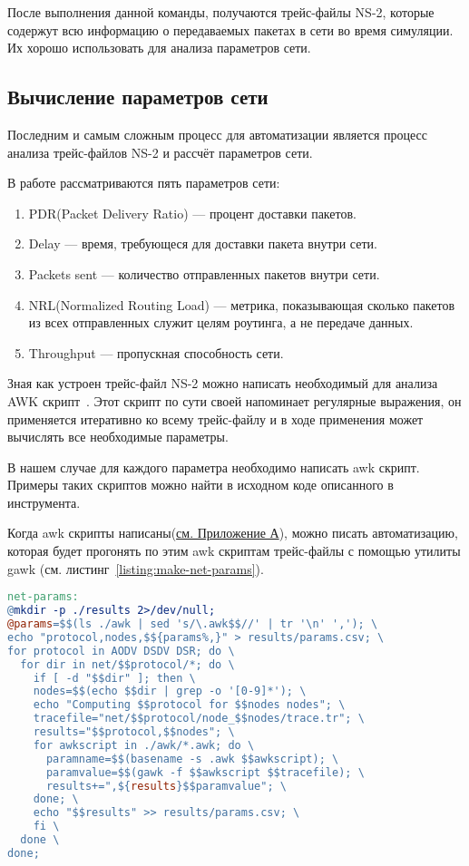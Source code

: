 После выполнения данной команды, получаются трейс-файлы NS-2, которые содержут всю информацию о передаваемых пакетах в сети во время симуляции. Их хорошо использовать для анализа параметров сети.

\subsection{Вычисление параметров сети}

Последним и самым сложным процесс для автоматизации является процесс анализа трейс-файлов NS-2 и рассчёт параметров сети.

В работе рассматриваются пять параметров сети:

\begin{enumerate}
  \item PDR(Packet Delivery Ratio) --- процент доставки пакетов.
  \item Delay --- время, требующеся для доставки пакета внутри сети.
  \item Packets sent --- количество отправленных пакетов внутри сети.
  \item NRL(Normalized Routing Load) --- метрика, показывающая сколько пакетов из всех отправленных служит целям роутинга, а не передаче данных.
  \item Throughput --- пропускная способность сети.
\end{enumerate}

Зная как устроен трейс-файл NS-2 можно написать необходимый для анализа AWK скрипт~\cite{ns2_awk_scripts}. Этот скрипт по сути своей напоминает регулярные выражения, он применяется итеративно ко всему трейс-файлу и в ходе применения может вычислять все необходимые параметры.

В нашем случае для каждого параметра необходимо написать awk скрипт. Примеры таких скриптов можно найти в исходном коде описанного в~\cite{ns2_analisys_tools} инструмента.

Когда awk скрипты написаны(\hyperlink{ap_awk}{см. Приложение А}), можно писать автоматизацию, которая будет прогонять по этим awk скриптам трейс-файлы с помощью утилиты gawk (см. листинг~\ref{listing:make-net-params}).

\begin{lstlisting}[language=make, style=mystyle, caption=Makefile для подсчёта параметров сети, label=listing:make-net-params]
net-params:
@mkdir -p ./results 2>/dev/null;
@params=$$(ls ./awk | sed 's/\.awk$$//' | tr '\n' ','); \
echo "protocol,nodes,$${params%,}" > results/params.csv; \
for protocol in AODV DSDV DSR; do \
  for dir in net/$$protocol/*; do \
    if [ -d "$$dir" ]; then \
    nodes=$$(echo $$dir | grep -o '[0-9]*'); \
    echo "Computing $$protocol for $$nodes nodes"; \
    tracefile="net/$$protocol/node_$$nodes/trace.tr"; \
    results="$$protocol,$$nodes"; \
    for awkscript in ./awk/*.awk; do \
      paramname=$$(basename -s .awk $$awkscript); \
      paramvalue=$$(gawk -f $$awkscript $$tracefile); \
      results+=",${results}$$paramvalue"; \
    done; \
    echo "$$results" >> results/params.csv; \
    fi \
  done \
done;
\end{lstlisting}

